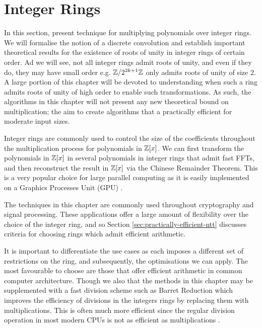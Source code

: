\chapter{Integer Rings}\label{chp:integer-rings}

In this section, present technique for multiplying polynomials over integer rings. We will formalise the notion of a discrete convolution and establish important theoretical results for the existence of roots of unity in integer rings of certain order. Ad we will see, not all integer rings admit roots of unity, and even if they do, they may have small order e.g. ${\mathbb Z}/2^{2k + 1}{\mathbb Z}$ only admits roots of unity of size $2$. A large portion of this chapter will be devoted to understanding when such a ring admits roots of unity of high order to enable such transformations. As such, the algorithms in this chapter will not present any new theoretical bound on multiplication; the aim to create algorithms that a practically efficient for moderate input sizes.


Integer rings are commonly used to control the size of the coefficients throughout the multiplication process for polynomials in ${\mathbb Z}[x]$. We can first transform the polynomials in ${\mathbb Z}[x]$ in several polynomials in integer rings that admit fast FFTs, and then reconstruct the result in ${\mathbb Z}[x]$ via the Chinese Remainder Theorem. This is a very popular choice for large parallel computing as it is easily implemented on a Graphics Processes Unit (GPU) \cite{gpu-mult} \cite{crt-parallel-mul} \cite{gpu-kepler-architecture}.

The techniques in this chapter are commonly used throughout cryptography and signal processing. These applications offer a large amount of flexibility over the choice of the integer ring, and so Section \ref{sec:practically-efficient-ntt} discusses criteria for choosing rings which admit efficient arithmetic.

It is important to differentiate the use cases as each imposes a different set of restrictions on the ring, and subsequently, the optimisations we can apply. The most favourable to choose are those that offer efficient arithmetic in common computer architecture. Though we also that the methods in this chapter may be supplemented with a fast division scheme such as Barret Reduction \cite{barret} which improves the efficiency of divisions in the integers rings by replacing them with multiplications. This is often much more efficient since the regular division operation in most modern CPUs is not as efficient as multiplications \cite{instruction-times}.

